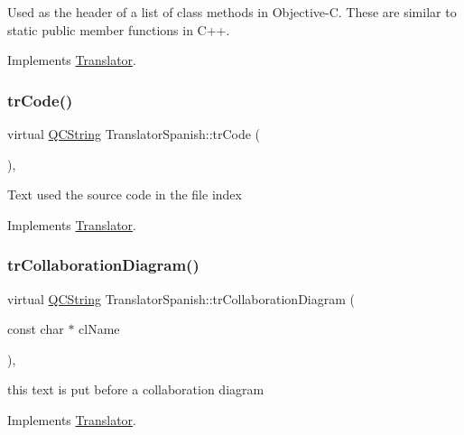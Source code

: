 Used as the header of a list of class methods in Objective-\/C. These are similar to static public member functions in C++. 

Implements \mbox{\hyperlink{class_translator}{Translator}}.

\mbox{\label{class_translator_spanish_a2269664098dcdea7728a9a58c395af5d}} 
\subsubsection{\texorpdfstring{trCode()}{trCode()}}
{\footnotesize\ttfamily virtual \mbox{\hyperlink{class_q_c_string}{Q\+C\+String}} Translator\+Spanish\+::tr\+Code (\begin{DoxyParamCaption}{ }\end{DoxyParamCaption})\hspace{0.3cm}{\ttfamily [inline]}, {\ttfamily [virtual]}}

Text used the source code in the file index 

Implements \mbox{\hyperlink{class_translator}{Translator}}.

\mbox{\label{class_translator_spanish_a61911f47c73a625e2bb7a60324e6e826}} 
\subsubsection{\texorpdfstring{trCollaborationDiagram()}{trCollaborationDiagram()}}
{\footnotesize\ttfamily virtual \mbox{\hyperlink{class_q_c_string}{Q\+C\+String}} Translator\+Spanish\+::tr\+Collaboration\+Diagram (\begin{DoxyParamCaption}\item[{const char $\ast$}]{cl\+Name }\end{DoxyParamCaption})\hspace{0.3cm}{\ttfamily [inline]}, {\ttfamily [virtual]}}

this text is put before a collaboration diagram 

Implements \mbox{\hyperlink{class_translator}{Translator}}.

\mbox{\label{class_translator_spanish_ac57e621e923ddae56708f5d0fbaf82a8}} 
